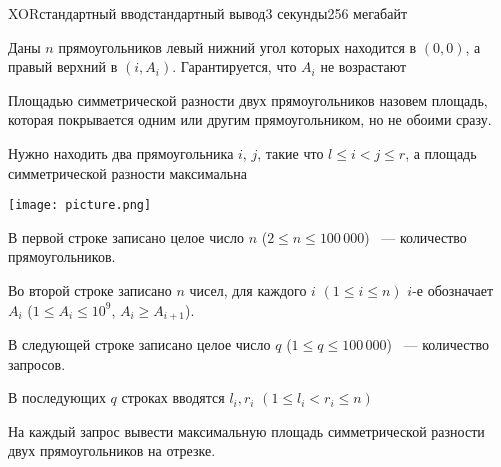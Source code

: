 \begin{problem}{XOR}{стандартный ввод}{стандартный вывод}{3 секунды}{256 мегабайт}

Даны $n$ прямоугольников левый нижний угол которых находится в $(0, 0)$, а правый верхний в $(i, A_i)$. Гарантируется, что $A_{i}$ не возрастают

Площадью симметрической разности двух прямоугольников назовем площадь, которая покрывается одним или другим прямоугольником, но не обоими сразу.

Нужно находить два прямоугольника $i$, $j$, такие что $l \leq i < j \leq r$, а площадь симметрической разности максимальна

\texttt{[image: picture.png]}

\InputFile
В первой строке записано целое число $n$ ($2 \le n \le 100\,000$) ~--- количество прямоугольников.

Во второй строке записано $n$ чисел, для каждого $i$ $(1 \le i \le n)$ $i$-е обозначает $A_{i}$ ($1 \le A_{i} \le 10^9$, $A_{i} \ge A_{i + 1}$).

В следующей строке записано целое число $q$ ($1 \le q \le 100\,000$) ~--- количество запросов.

В последующих $q$ строках вводятся $l_{i}, r_{i}$ $(1 \le l_{i} < r_{i} \le n)$

\OutputFile
На каждый запрос вывести максимальную площадь симметрической разности двух прямоугольников на отрезке.

\Example

\begin{example}
%
\end{example}

\end{problem}


